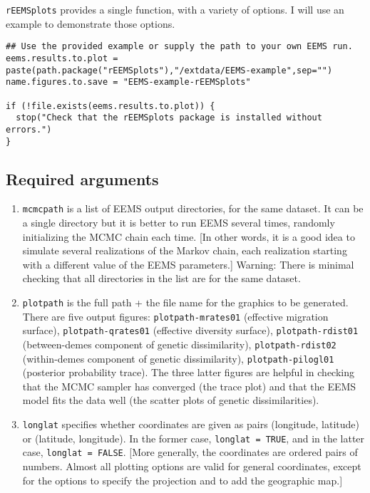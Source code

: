 \documentclass[a4paper,10pt,DIV=15,titlepage,mpinclude=true]{scrartcl}
\newcommand{\keystring}[1]{{\tt #1}}
\begin{document}
\keystring{rEEMSplots} provides a single function, with a variety of options. I will use an example to demonstrate those options.

\begin{lstlisting}[style=Rcode]
## Use the provided example or supply the path to your own EEMS run.
eems.results.to.plot = paste(path.package("rEEMSplots"),"/extdata/EEMS-example",sep="")
name.figures.to.save = "EEMS-example-rEEMSplots"

if (!file.exists(eems.results.to.plot)) {
  stop("Check that the rEEMSplots package is installed without errors.")
}
\end{lstlisting}

\subsection{Required arguments}

\begin{enumerate}
  \item \keystring{mcmcpath} is a list of EEMS output directories, for the same dataset. It can be a single directory but it is better to run EEMS several times, randomly initializing the MCMC chain each time. [In other words, it is a good idea to simulate several realizations of the Markov chain, each realization starting with a different value of the EEMS parameters.] Warning: There is minimal checking that all directories in the list are for the same dataset.
  \item \keystring{plotpath} is the full path + the file name for the graphics to be generated. There are five output figures: \keystring{plotpath-mrates01} (effective migration surface), \keystring{plotpath-qrates01} (effective diversity surface), \keystring{plotpath-rdist01} (between-demes component of genetic dissimilarity), \keystring{plotpath-rdist02} (within-demes component of genetic dissimilarity), \keystring{plotpath-pilogl01} (posterior probability trace). The three latter figures are helpful in checking that the MCMC sampler has converged (the trace plot) and that the EEMS model fits the data well (the scatter plots of genetic dissimilarities).
  \item \keystring{longlat} specifies whether coordinates are given as pairs (longitude, latitude) or (latitude, longitude). In the former case, \keystring{longlat = TRUE}, and in the latter case, \keystring{longlat = FALSE}. [More generally, the coordinates are ordered pairs of numbers. Almost all plotting options are valid for general coordinates, except for the options to specify the projection and to add the geographic map.]
\end{enumerate}
\end{document}
